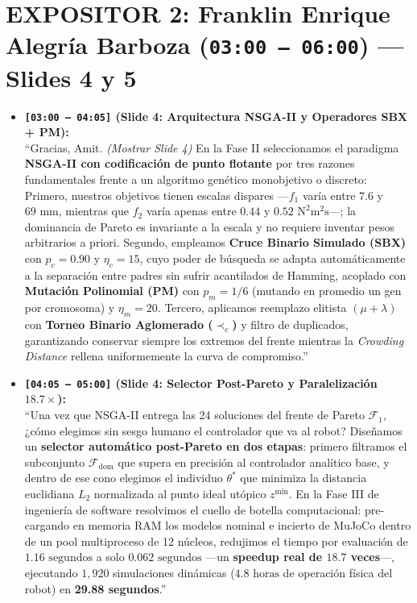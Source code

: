 \documentclass[11pt,a4paper]{article}
\begin{document}
\section*{EXPOSITOR 2: Franklin Enrique Alegría Barboza (\texttt{03:00 -- 06:00}) — Slides 4 y 5}
\begin{itemize}
    \item \textbf{\texttt{[03:00 -- 04:05]} (Slide 4: Arquitectura NSGA-II y Operadores SBX + PM):} \\
    ``Gracias, Amit. \textit{(Mostrar Slide 4)} En la Fase II seleccionamos el paradigma \textbf{NSGA-II con codificación de punto flotante} por tres razones fundamentales frente a un algoritmo genético monobjetivo o discreto: Primero, nuestros objetivos tienen escalas dispares —$f_1$ varía entre $7.6$ y $69\text{ mm}$, mientras que $f_2$ varía apenas entre $0.44$ y $0.52\text{ N}^2\text{m}^2\text{s}$—; la dominancia de Pareto es invariante a la escala y no requiere inventar pesos arbitrarios a priori. Segundo, empleamos \textbf{Cruce Binario Simulado (SBX)} con $p_c = 0.90$ y $\eta_c = 15$, cuyo poder de búsqueda se adapta automáticamente a la separación entre padres sin sufrir acantilados de Hamming, acoplado con \textbf{Mutación Polinomial (PM)} con $p_m = 1/6$ (mutando en promedio un gen por cromosoma) y $\eta_m = 20$. Tercero, aplicamos reemplazo elitista $(\mu+\lambda)$ con \textbf{Torneo Binario Aglomerado ($\prec_c$)} y filtro de duplicados, garantizando conservar siempre los extremos del frente mientras la \textit{Crowding Distance} rellena uniformemente la curva de compromiso.''

    \item \textbf{\texttt{[04:05 -- 05:00]} (Slide 4: Selector Post-Pareto y Paralelización $18.7\times$):} \\
    ``Una vez que NSGA-II entrega las 24 soluciones del frente de Pareto $\mathcal{F}_1$, ¿cómo elegimos sin sesgo humano el controlador que va al robot? Diseñamos un \textbf{selector automático post-Pareto en dos etapas}: primero filtramos el subconjunto $\mathcal{F}_{\text{dom}}$ que supera en precisión al controlador analítico base, y dentro de ese cono elegimos el individuo $\theta^*$ que minimiza la distancia euclidiana $L_2$ normalizada al punto ideal utópico $z^{\min}$. En la Fase III de ingeniería de software resolvimos el cuello de botella computacional: pre-cargando en memoria RAM los modelos nominal e incierto de MuJoCo dentro de un pool multiproceso de 12 núcleos, redujimos el tiempo por evaluación de $1.16\text{ segundos}$ a solo \textbf{$0.062\text{ segundos}$} —un \textbf{speedup real de $18.7$ veces}—, ejecutando $1,920$ simulaciones dinámicas ($4.8\text{ horas}$ de operación física del robot) en \textbf{29.88 segundos}.''


\end{itemize}
\end{document}
